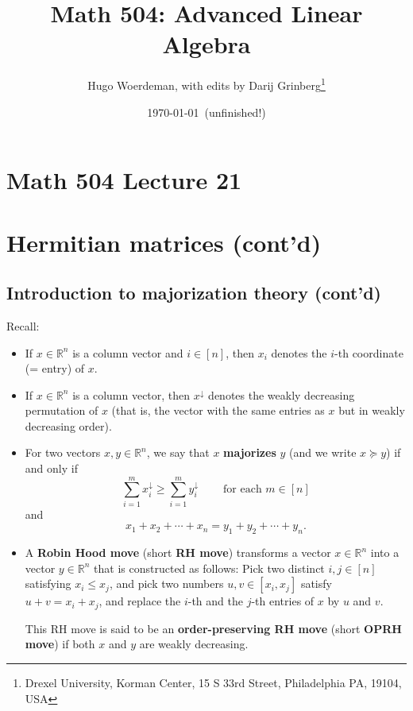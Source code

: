 \documentclass[numbers=enddot,12pt,final,onecolumn,notitlepage]{scrartcl}%
\numberwithin{exer}{subsection}
\theoremstyle{definition}
\let\sumnonlimits\sum
\renewcommand{\sum}{\sumnonlimits\limits}
\begin{document}
\title{Math 504: Advanced Linear Algebra}
\author{Hugo Woerdeman, with edits by Darij Grinberg\thanks{Drexel University, Korman
Center, 15 S 33rd Street, Philadelphia PA, 19104, USA}}
\date{\today\ (unfinished!)}
\maketitle
\tableofcontents

\section*{Math 504 Lecture 21}

\section{Hermitian matrices (cont'd)}

\subsection{Introduction to majorization theory (cont'd)}

Recall:

\begin{itemize}
\item If $x\in\mathbb{R}^{n}$ is a column vector and $i\in\left[  n\right]  $,
then $x_{i}$ denotes the $i$-th coordinate (= entry) of $x$.

\item If $x\in\mathbb{R}^{n}$ is a column vector, then $x^{\downarrow}$
denotes the weakly decreasing permutation of $x$ (that is, the vector with the
same entries as $x$ but in weakly decreasing order).

\item For two vectors $x,y\in\mathbb{R}^{n}$, we say that $x$
\textbf{majorizes} $y$ (and we write $x\succcurlyeq y$) if and only if
\[
\sum_{i=1}^{m}x_{i}^{\downarrow}\geq\sum_{i=1}^{m}y_{i}^{\downarrow
}\ \ \ \ \ \ \ \ \ \ \text{for each }m\in\left[  n\right]
\]
and%
\[
x_{1}+x_{2}+\cdots+x_{n}=y_{1}+y_{2}+\cdots+y_{n}.
\]


\item A \textbf{Robin Hood move} (short \textbf{RH move}) transforms a vector
$x\in\mathbb{R}^{n}$ into a vector $y\in\mathbb{R}^{n}$ that is constructed as
follows: Pick two distinct $i,j\in\left[  n\right]  $ satisfying $x_{i}\leq
x_{j}$, and pick two numbers $u,v\in\left[  x_{i},x_{j}\right]  $ satisfy
$u+v=x_{i}+x_{j}$, and replace the $i$-th and the $j$-th entries of $x$ by $u$
and $v$.

This RH move is said to be an \textbf{order-preserving RH move} (short
\textbf{OPRH move}) if both $x$ and $y$ are weakly decreasing.
\end{itemize}
\end{document}
